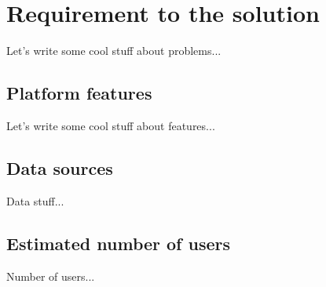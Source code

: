 \section{Requirement to the solution}

Let's write some cool stuff about problems...


\subsection{Platform features}

Let's write some cool stuff about features...

\subsection{Data sources}

Data stuff...

\subsection{Estimated number of users}

Number of users...
